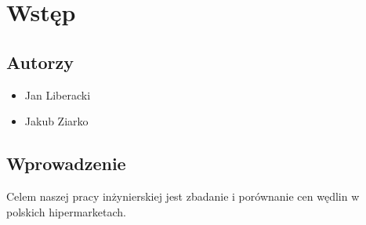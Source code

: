 \section{Wstęp}
 
\subsection{Autorzy}
\begin{itemize}
\item Jan Liberacki
\item Jakub Ziarko
\end{itemize}

\subsection{Wprowadzenie}
Celem naszej pracy inżynierskiej jest zbadanie i porównanie cen wędlin w polskich hipermarketach.